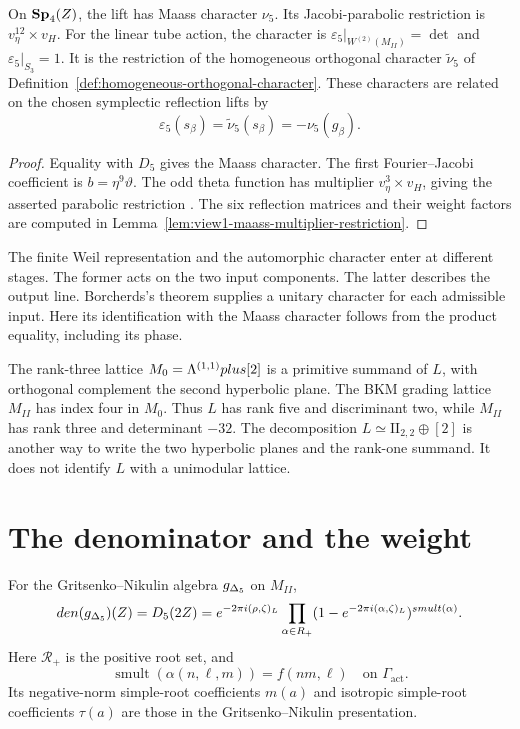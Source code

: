 \begin{theorem}
\label{thm:multiplier-system}
On \(\mathbf{Sp}_4(Z)\), the lift has Maass character \(\nu_5\).
Its Jacobi-parabolic restriction is
\(v_\eta^{12}\times v_H\).
For the linear tube action, the character is
\(\varepsilon_5|_{W^{(2)}(M_{II})}=\det\) and
\(\varepsilon_5|_{S_3}=1\).
It is the restriction of the homogeneous orthogonal character
\(\widetilde\nu_5\) of Definition~\ref{def:homogeneous-orthogonal-character}.
These characters are related on the chosen symplectic reflection
lifts by
\[
 \varepsilon_5(s_\beta)=\widetilde\nu_5(s_\beta)=-\nu_5(g_\beta).
\]
\end{theorem}

\begin{proof}
Equality with \(D_5\) gives the Maass character.
The first Fourier--Jacobi coefficient is
\(b=\eta^9\vartheta\).
The odd theta function has multiplier \(v_\eta^3\times v_H\),
giving the asserted parabolic restriction
\cite[(13)]{GC}.
The six reflection matrices and their weight factors are computed in
Lemma~\ref{lem:view1-maass-multiplier-restriction}.
\end{proof}

The finite Weil representation and the automorphic character enter
at different stages.  The former acts on the two input components.
The latter describes the output line.
Borcherds's theorem supplies a unitary character for each admissible
input.  Here its identification with the Maass character follows
from the product equality, including its phase.

The rank-three lattice \(M_0=\Lambda^{(1,1)}plus[2]\) is a primitive
summand of \(L\), with orthogonal complement the second
hyperbolic plane.  The BKM grading lattice \(M_{II}\) has index
four in \(M_0\).
Thus \(L\) has rank five and discriminant two, while \(M_{II}\)
has rank three and determinant \(-32\).
The decomposition \(L\simeq\mathrm{II}_{2,2}\oplus[2]\)
is another way to write the two hyperbolic planes and the rank-one
summand.  It does not identify \(L\) with a unimodular lattice.

\section{The denominator and the weight}
\label{ssec:compat-view-ii}

\begin{theorem}
\label{thm:lift-denominator}
For the Gritsenko--Nikulin algebra \({g_{\Delta_5}}\) on \(M_{II}\),
\[
 den({g_{\Delta_5}})(Z)
 =D_5(2Z)
 =e^{-2\pi i(\rho,\zeta)_L}
   \prod_{\alpha\in R_+}
         (1-e^{-2\pi i(\alpha,\zeta)_L})^{smult(\alpha)}.
\]
Here \(\mathcal R_+\) is the positive root set, and
\[
 \operatorname{smult}(\alpha(n,\ell,m))=f(nm,\ell)
 \quad\text{on }\Gamma_{\mathrm{act}}.
\]
Its negative-norm simple-root coefficients \(m(a)\) and isotropic
simple-root coefficients \(\tau(a)\) are those in the
Gritsenko--Nikulin presentation.
\end{theorem}

